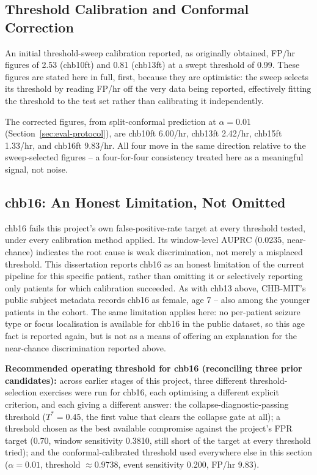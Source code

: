 \subsection{Threshold Calibration and Conformal Correction}

An initial threshold-sweep calibration reported, as originally obtained, FP/hr figures of 2.53 (chb10ft) and 0.81 (chb13ft) at a swept threshold of 0.99. These figures are stated here in full, first, because they are optimistic: the sweep selects its threshold by reading FP/hr off the very data being reported, effectively fitting the threshold to the test set rather than calibrating it independently.

The corrected figures, from split-conformal prediction at $\alpha=0.01$ (Section~\ref{sec:eval-protocol}), are chb10ft 6.00/hr, chb13ft 2.42/hr, chb15ft 1.33/hr, and chb16ft 9.83/hr. All four move in the same direction relative to the sweep-selected figures -- a four-for-four consistency treated here as a meaningful signal, not noise.

\subsection{chb16: An Honest Limitation, Not Omitted}

chb16 fails this project's own false-positive-rate target at every threshold tested, under every calibration method applied. Its window-level AUPRC (0.0235, near-chance) indicates the root cause is weak discrimination, not merely a misplaced threshold. This dissertation reports chb16 as an honest limitation of the current pipeline for this specific patient, rather than omitting it or selectively reporting only patients for which calibration succeeded.
As with chb13 above, CHB-MIT's public subject metadata \citep{chbmit_subject_info} records chb16 as female, age 7 -- also among the younger patients in the cohort. 
The same limitation applies here: no per-patient seizure type or focus localisation is available for chb16 in the public dataset, so this age fact is reported again, 
but is not as a means of offering an explanation for the near-chance discrimination reported above.

\textbf{Recommended operating threshold for chb16 (reconciling three prior candidates):} across earlier stages of this project, three different threshold-selection exercises were run for chb16, each optimising a different explicit criterion, and each giving a different answer: the collapse-diagnostic-passing threshold ($T^{*}=0.45$, the first value that clears the collapse gate at all); a threshold chosen as the best available compromise against the project's FPR target (0.70, window sensitivity 0.3810, still short of the target at every threshold tried); and the conformal-calibrated threshold used everywhere else in this section ($\alpha=0.01$, threshold $\approx 0.9738$, event sensitivity 0.200, FP/hr 9.83).

